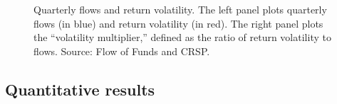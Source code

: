 \documentclass[12pt,english]{article}
\begin{document}
\begin{figure}[!t]
    \centering
    \subfloat{\resizebox{0.49\textwidth}{!}{}}
    \subfloat{\resizebox{0.49\textwidth}{!}{}}
    \vspace{2mm}
    \caption{Quarterly flows and return volatility. The left panel plots quarterly flows (in blue) and return volatility (in red). The right panel plots the ``volatility multiplier,'' defined as the ratio of return volatility to flows. Source: Flow of Funds and CRSP.}\label{fig:facts-vol-flow}
\end{figure}



\begin{table}[t]    
    \centering
    \resizebox{.62\linewidth}{!}{}
	\vspace{2mm}
    \captionsetup{type=table,font=footnotesize,justification=centering,singlelinecheck=false}
    \caption{\textbf{Parameter values.}\\This table reports the parameter values used in calibrating the model.}\label{tab:calib}
\end{table}

\subsection{Quantitative results}
\end{document}
